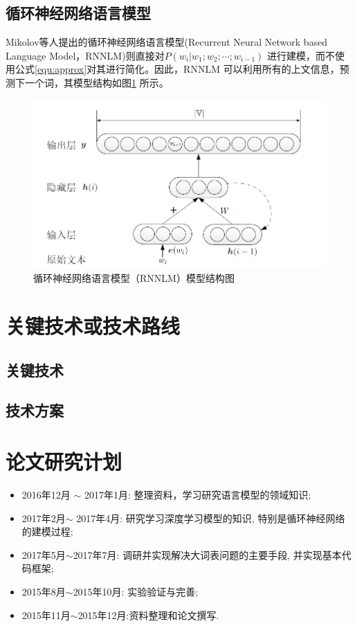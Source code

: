\documentclass[12pt,a4paper]{article}
\begin{document}
\subsection{循环神经网络语言模型}
Mikolov等人提出的循环神经网络语言模型(Recurrent Neural Network based Language Model，RNNLM)则直接对$P(w_i | w_1;w_2;\cdots;w_{i-1}) $ 进行建模，而不使用公式\ref{equ:approx}对其进行简化\cite{mikolov2012statistical,DBLP:conf/interspeech/MikolovKBCK10}。因此，RNNLM 可以利用所有的上文信息，预测下一个词，其模型结构如图\ref{fig:rnnlm} 所示。
\begin{figure}
  \centering
  \includegraphics[width=0.85\linewidth]{./figures/rnnlm.png}
  \caption{循环神经网络语言模型（RNNLM）模型结构图}\label{fig:rnnlm}
\end{figure}


\section{关键技术或技术路线}
\subsection{关键技术}

\subsection{技术方案}
\section{论文研究计划}
\begin{itemize}
  \item 2016年12月 $\sim$ 2017年1月: 整理资料，学习研究语言模型的领域知识;
  \item 2017年2月$\sim$ 2017年4月: 研究学习深度学习模型的知识, 特别是循环神经网络的建模过程;
  \item 2017年5月$\sim$2017年7月: 调研并实现解决大词表问题的主要手段, 并实现基本代码框架;
  \item 2015年8月$\sim$2015年10月: 实验验证与完善;
  \item 2015年11月$\sim$2015年12月:资料整理和论文撰写.
\end{itemize}



\newpage
{}

\end{document}
